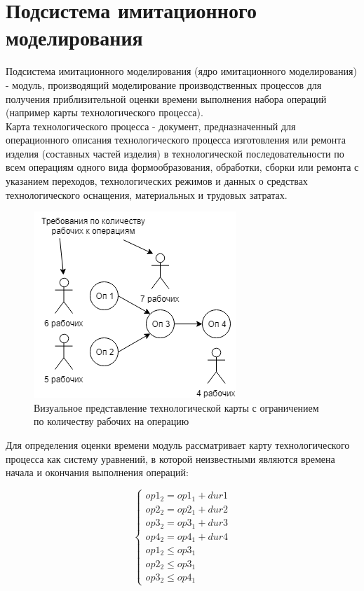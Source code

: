 \section{Подсистема имитационного моделирования}
\indent Подсистема имитационного моделирования (ядро имитационного моделирования) - модуль, производящий моделирование производственных процессов для получения приблизительной оценки времени выполнения набора операций (например карты технологического процесса).\\
\indent Карта технологического процесса - документ, предназначенный для операционного описания технологического процесса изготовления или ремонта изделия (составных частей изделия) в технологической последовательности по всем операциям одного вида формообразования, обработки, сборки или ремонта с указанием переходов, технологических режимов и данных о средствах технологического оснащения, материальных и трудовых затратах.

\begin{figure}[ht]
	\centering
	\includegraphics[width=0.7\linewidth]{pics/techMapViz.png}
	\caption{Визуальное представление технологической карты с ограничением по количеству рабочих на операцию}
	\label{fig:map}
\end{figure}

\indent Для определения оценки времени модуль рассматривает карту технологического процесса как систему уравнений, в которой неизвестными являются времена начала и окончания выполнения операций:

\begin{equation}
	\label{eq:system}
	\begin{cases}
		op1_2 = op1_1 + dur1\\
		op2_2 = op2_1 + dur2\\
		op3_2 = op3_1 + dur3\\
		op4_2 = op4_1 + dur4\\
		op1_2 \leq op3_1\\
		op2_2 \leq op3_1\\
		op3_2 \leq op4_1
	\end{cases}
\end{equation}

